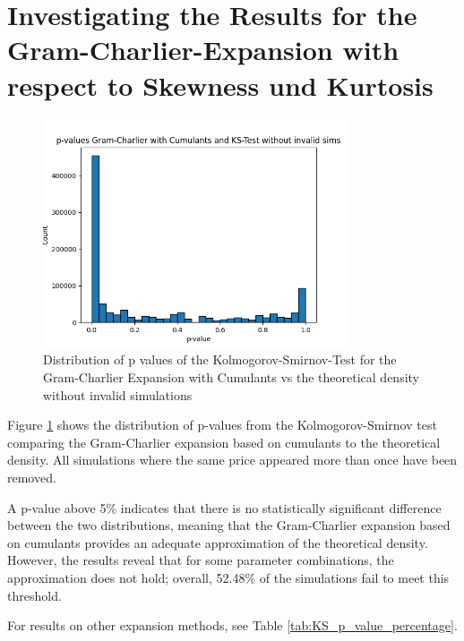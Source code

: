 \section{Investigating the Results for the Gram-Charlier-Expansion with respect to Skewness und Kurtosis}

\begin{figure}
    \centering
    \includegraphics[width=0.8\textwidth]{img/GC_cum_KS_p_value_histogram.png}
    \caption{Distribution of p values of the Kolmogorov-Smirnov-Test for the Gram-Charlier Expansion with Cumulants vs the theoretical density without invalid simulations}
    \label{fig:GC_cum_KS_p_value_histogram}
\end{figure}

Figure \ref{fig:GC_cum_KS_p_value_histogram} shows the distribution of p-values from the Kolmogorov-Smirnov test comparing the Gram-Charlier expansion based on cumulants to the theoretical density. All simulations where the same price appeared more than once have been removed.

A p-value above 5\% indicates that there is no statistically significant difference between the two distributions, meaning that the Gram-Charlier expansion based on cumulants provides an adequate approximation of the theoretical density. However, the results reveal that for some parameter combinations, the approximation does not hold; overall, 52.48\% of the simulations fail to meet this threshold.

For results on other expansion methods, see Table \ref{tab:KS_p_value_percentage}.

